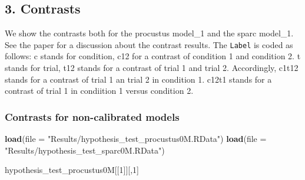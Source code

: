 \documentclass[
]{article}
\newenvironment{Shaded}{\begin{snugshade}}{\end{snugshade}}
\newcommand{\AttributeTok}[1]{\textcolor[rgb]{0.13,0.29,0.53}{#1}}
\newcommand{\DecValTok}[1]{\textcolor[rgb]{0.00,0.00,0.81}{#1}}
\newcommand{\FunctionTok}[1]{\textcolor[rgb]{0.13,0.29,0.53}{\textbf{#1}}}
\newcommand{\NormalTok}[1]{#1}
\newcommand{\StringTok}[1]{\textcolor[rgb]{0.31,0.60,0.02}{#1}}
\begin{document}
\hypertarget{contrasts}{%
\subsection{3. Contrasts}\label{contrasts}}

We show the contrasts both for the procustus model\_1 and the sparc
model\_1. See the paper for a discussion about the contrast results. The
\texttt{Label} is coded as follows: c stands for condition, c12 for a
contrast of condition 1 and condition 2. t stands for trial, t12 stands
for a contrast of trial 1 and trial 2. Accordingly, c1t12 stands for a
contrast of trial 1 an trial 2 in condition 1. c12t1 stands for a
contrast of trial 1 in condiition 1 versus condition 2.

\hypertarget{contrasts-for-non-calibrated-models}{%
\subsubsection{Contrasts for non-calibrated
models}\label{contrasts-for-non-calibrated-models}}

\begin{Shaded}
\begin{Highlighting}[]
\FunctionTok{load}\NormalTok{(}\AttributeTok{file =} \StringTok{"Results/hypothesis\_test\_procustus0M.RData"}\NormalTok{)}
\FunctionTok{load}\NormalTok{(}\AttributeTok{file =} \StringTok{"Results/hypothesis\_test\_sparc0M.RData"}\NormalTok{)}

\NormalTok{hypothesis\_test\_procustus0M[[}\DecValTok{1}\NormalTok{]][,}\DecValTok{1}\NormalTok{]}
\end{Highlighting}
\end{Shaded}
\end{document}
